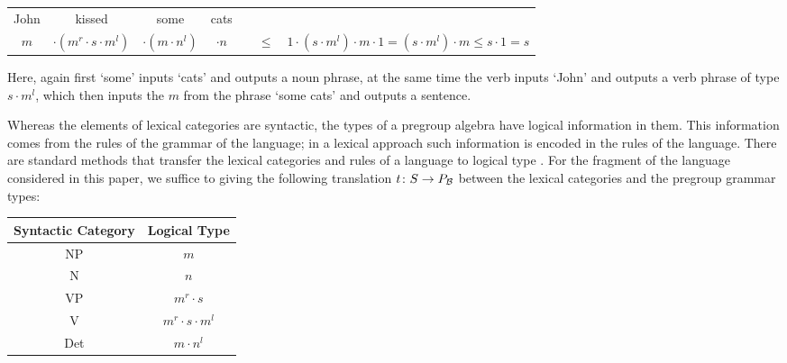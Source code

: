 \begin{center}
\begin{tabular}{ccccc}
John & kissed & some & cats&\\
$m$ & $\cdot (m^r \cdot s \cdot m^l)$ & $\cdot (m \cdot n^l)$ & $\cdot n$ & $\quad \leq \quad 1 \cdot (s \cdot m^l) \cdot m  \cdot 1 = (s \cdot m^l) \cdot m \leq  s\cdot 1 = s$
\end{tabular}
\end{center}

\noindent
Here, again first `some' inputs `cats' and outputs a noun phrase, at the same time the verb inputs `John' and outputs a verb phrase of type $s \cdot m^l$, which then  inputs the $m$ from the phrase `some cats' and outputs a sentence. 


Whereas the elements of lexical categories are syntactic, the types of a pregroup algebra have logical information in them.  This information comes from the rules of the grammar of the language;  in a lexical approach such information is encoded in the rules of the language. There are standard methods that transfer the lexical categories and rules of a language to logical type \cite{Penthus}. For the  fragment of the language considered in  this paper, we suffice to giving the following translation $t \colon S \to P_{\cal B}$ between the lexical categories and the pregroup grammar types:

\begin{center}
\begin{tabular}{c|c}
Syntactic Category & Logical Type\\
\hline
NP & $m$\\
N & $n$\\
VP &  $m^r \cdot s$\\
V  & $m^r \cdot s \cdot m^l$\\
Det  & $m \cdot n^l$
\end{tabular}
\end{center}

%


